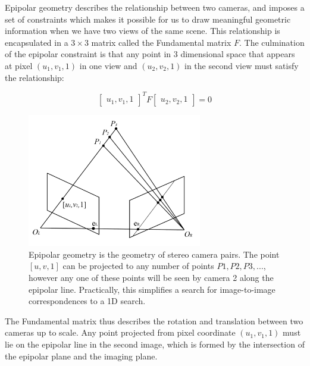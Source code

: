 \documentclass[openany]{book}
\begin{document}
Epipolar geometry describes the relationship between two cameras, and imposes a set of constraints which makes it possible for us to draw meaningful geometric information when we have two views of the same scene. This relationship is encapsulated in a $3 \times 3$ matrix called the Fundamental matrix $F$. The culmination of the epipolar constraint is that any point in 3 dimensional space that appears at pixel $(u_1, v_1, 1)$ in one view and $(u_2, v_2, 1)$ in the second view must satisfy the relationship:

\begin{equation}
    \begin{bmatrix}
        u_1, v_1, 1
    \end{bmatrix}^T
    F
    \begin{bmatrix}
        u_2, v_2, 1
    \end{bmatrix}
    = 0
\end{equation}

\begin{figure}
    \centering
    \includegraphics[width=3in]{images/epipolarplane.png}
    \caption{Epipolar geometry is the geometry of stereo camera pairs. The point $[u,v,1]$ can be projected to any number of points $P1, P2, P3, ... $, however any one of these points will be seen by camera 2 along the epipolar line. Practically, this simplifies a search for image-to-image correspondences to a 1D search.}
    \label{epipolarplane}
\end{figure}

The Fundamental matrix thus describes the rotation and translation between two cameras up to scale. Any point projected from pixel coordinate $(u_1, v_1, 1)$ must lie on the epipolar line in the second image, which is formed by the intersection of the epipolar plane and the imaging plane. 
\end{document}
